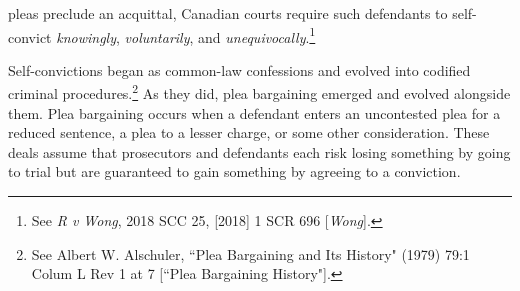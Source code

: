 pleas preclude an acquittal, Canadian courts require such defendants to self-convict \textit{knowingly}, \textit{voluntarily}, and \textit{unequivocally}.\footnote{See \textit{R v Wong}, 2018 SCC 25, [2018] 1 SCR 696 [\textit{Wong}].}

Self-convictions began as common-law confessions and evolved into codified criminal procedures.\footnote{See Albert W. Alschuler, ``Plea Bargaining and Its History" (1979) 79:1 Colum L Rev 1 at 7 [``Plea Bargaining History"].} As they did, plea bargaining emerged and evolved alongside them. Plea bargaining occurs when a defendant enters an uncontested plea for a reduced sentence, a plea to a lesser charge, or some other consideration. These deals assume that prosecutors and defendants each risk losing something by going to trial but are guaranteed to gain something by agreeing to a conviction.

